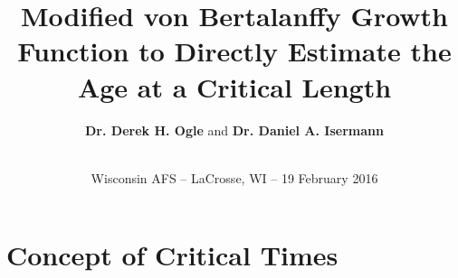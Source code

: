 \documentclass[xcolor=dvipsnames,t]{beamer}\usepackage[]{graphicx}\usepackage[]{color}
\begin{document}
\title[Critical Time from Modified VBGF]{Modified von Bertalanffy Growth Function to Directly Estimate the Age at a Critical Length}
\author[Ogle \& Isermann]{\textbf{Dr. Derek H. Ogle}  and \textbf{Dr. Daniel A. Isermann} }
\date[WI AFS 2016]{ \\[2\baselineskip] Wisconsin AFS -- LaCrosse, WI -- 19 February 2016}
\maketitle

\AtBeginSection[] {
\begin{frame}
\frametitle{}
\tableofcontents[currentsection]
\end{frame}
}



\section{Concept of Critical Times}
\end{document}
